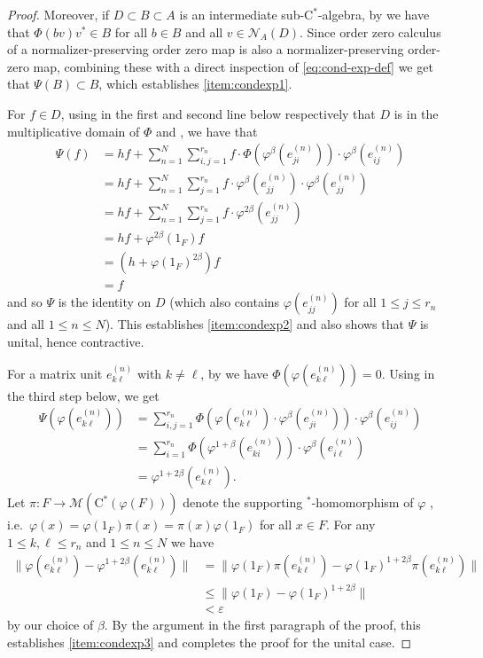 \documentclass[11pt,a4paper]{amsart}
\theoremstyle{definition}
\numberwithin{equation}{section}
\begin{document}
\begin{proof}
Moreover, if $D\subset B\subset A$ is an intermediate sub-$\mathrm{C}^\ast$-algebra, by \cite[Proposition~3.10]{DonsigPitts08} we have that $\Phi(bv)v^*\in B$ for all $b\in B$ and all $v\in\mathcal{N}_A(D)$. Since order zero calculus of a normalizer-preserving order zero map is also a normalizer-preserving order-zero map, combining these with a direct inspection of \eqref{eq:cond-exp-def} we get that $\Psi(B)\subset B$, which establishes \ref{item:condexp1}.

For $f\in D$, using in the first and second line below respectively that $D$ is in the multiplicative domain of $\Phi$ and , we have that
\begin{align*}
\Psi(f) &= h f + \sum_{n=1}^N\sum_{i,j=1}^{r_n}f\cdot \Phi(\varphi^\beta(e_{ji}^{(n)}))\cdot\varphi^\beta(e_{ij}^{(n)})\\
&=  hf + \sum_{n=1}^N\sum_{j=1}^{r_n}f\cdot\varphi^\beta(e_{jj}^{(n)})\cdot\varphi^\beta(e_{jj}^{(n)})\\
&=hf + \sum_{n=1}^N\sum_{j=1}^{r_n}f\cdot \varphi^{2\beta}(e_{jj}^{(n)})\\
&= hf + \varphi^{2\beta}(1_F)f\\
&= (h+\varphi(1_F)^{2\beta})f\\
&=f
\end{align*}
and so $\Psi$ is the identity on $D$ (which also contains $\varphi(e_{jj}^{(n)})$ for all $1\le j\le r_n$ and all $1\le n\le N$). This establishes \ref{item:condexp2} and also shows that $\Psi$ is unital, hence contractive.

For a matrix unit $e_{k\ell}^{(n)}$ with $k\neq \ell$, by  we have $\Phi(\varphi(e_{k\ell}^{(n)}))=0$. Using  in the third step below, we get
\begin{align*}
\Psi(\varphi(e_{k\ell}^{(n)}))  &= \sum_{i,j=1}^{r_n}\Phi(\varphi(e_{k\ell}^{(n)})\cdot\varphi^\beta(e_{ji}^{(n)}))\cdot\varphi^\beta(e_{ij}^{(n)})\\
&= \sum_{i=1}^{r_n}\Phi(\varphi^{1+\beta}(e_{ki}^{(n)}))\cdot\varphi^\beta(e_{i\ell}^{(n)})\\
&=\varphi^{1+2\beta}(e_{k\ell}^{(n)}).
\end{align*}
Let $\pi\colon F\to \mathcal{M}(\mathrm{C}^\ast(\varphi(F)))$ denote the supporting $^*$-homomorphism of $\varphi$ \cite[Theorem~2.3]{WinZac09}, i.e.\ $\varphi(x)=\varphi(1_F)\pi(x)=\pi(x)\varphi(1_F)$ for all $x\in F$. For any $1\le k,\ell\le r_n$ and $1\le n\le N$ we have
\begin{align*}
\|\varphi(e_{k\ell}^{(n)})-\varphi^{1+2\beta}(e_{k\ell}^{(n)})\|&=\|\varphi(1_F)\pi(e_{k\ell}^{(n)})-\varphi(1_F)^{1+2\beta}\pi(e_{k\ell}^{(n)})\|\\
&\le \|\varphi(1_F)-\varphi(1_F)^{1+2\beta}\|\\
&<\varepsilon
\end{align*} 
by our choice of $\beta$. By the argument in the first paragraph of the proof, this establishes \ref{item:condexp3} and completes the proof for the unital case.


\end{proof}
\end{document}
